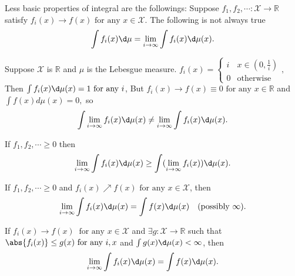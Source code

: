 \documentclass[a4paper]{article}
\begin{document}
\begin{prop}Less basic properties of integral are the followings:
	Suppose $f_1, f_2, \cdots: \mathcal{X} \to \mathbb{R}$ satisfy $f_i(x) \to f(x) \text{ for any } x \in \mathcal{X}.$ The following is not always true
	 \begin{equation}
		 \int f_i(x) \d \mu = \lim\limits_{i \to \infty} \int f_i(x) \d \mu (x).
	 \end{equation}
\end{prop}

\begin{eg}
	Suppose $\mathcal{X}$ is $\mathbb{R}$ and $\mu$ is the Lebesgue measure. $f_i(x) = \left\{
	\begin{array}{ll}
		i & x \in (0, \frac{1}{i}) \\
		0 & \text{otherwise}
	\end{array}
	\right.,$ Then $\int f_i(x) \d \mu (x) = 1 \text{ for any } i$, But $f_i(x) \to f(x) \equiv 0 \text{ for any } x \in \mathbb{R}$ and $\int f(x) d \mu (x) = 0,$ so
	\begin{equation}
		\int \lim\limits_{i \to \infty} f_i (x) \d \mu (x) \neq \lim\limits_{i \to \infty} \int f_i (x) \d \mu (x).
	\end{equation}
\end{eg}

\begin{lemma}
	If $f_1, f_2, \cdots \geq 0$ then
	\begin{equation}
	\lim\limits_{i \to \infty} \int f_i (x) \d \mu (x) \geq \int (\lim\limits_{i \to \infty} f_i (x)) \d \mu (x).
	\end{equation}
\end{lemma}

\begin{thm}
	If $f_1, f_2, \cdots \geq 0$ and $f_i(x) \nearrow f(x) \text{ for any } x \in \mathcal{X}$, then
	\begin{equation}
		\lim\limits_{i \to \infty} \int f_i (x) \d \mu (x) = \int f(x) \d \mu (x) \quad (\text{possibly } \infty).
	\end{equation}
\end{thm}

\begin{thm}
	If $f_i (x) \to f(x) \ \text{ for any } x \in \mathcal{X}$ and $\exists g: \mathcal{X} \to \mathbb{R}$ such that $\abs{f_i(x)} \leq g(x) \text{ for any } i, x$ and $\int g(x) \d \mu (x) < \infty$, then
	\begin{equation}
		\lim\limits_{i \to \infty} \int f_i (x) \d \mu (x) = \int f(x) \d \mu (x).
	\end{equation}
\end{thm}
\end{document}
